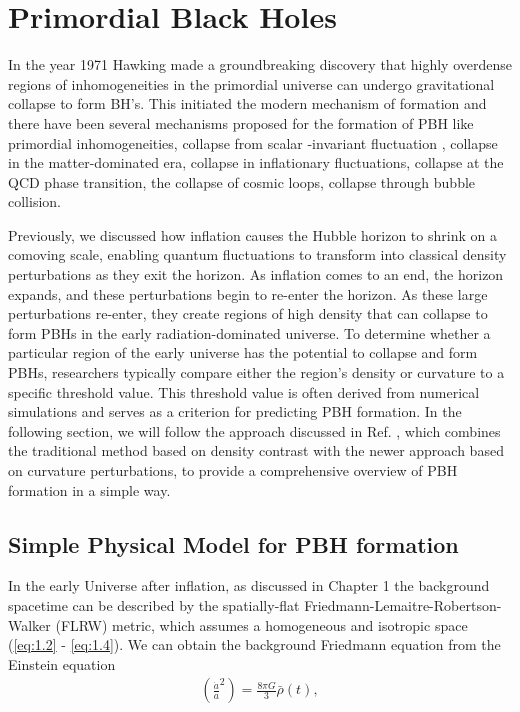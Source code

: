 \chapter{Primordial Black Holes}
\hspace{0.5cm}In the year 1971 Hawking \cite{1971MNRAS.152...75H} made a groundbreaking discovery that highly overdense regions of inhomogeneities in the primordial universe can undergo gravitational collapse to form BH's. This initiated the modern mechanism of formation and there have been several mechanisms proposed for the formation of PBH like primordial inhomogeneities\cite{1975ApJ...201....1C}, collapse from scalar -invariant fluctuation \cite{1975ApJ...201....1C}, collapse in the matter-dominated era, collapse in inflationary fluctuations, collapse at the QCD phase transition, the collapse of cosmic loops, collapse through bubble collision.

\hspace{0.5cm} Previously, we discussed how inflation causes the Hubble horizon to shrink on a comoving scale, enabling quantum fluctuations to transform into classical density perturbations as they exit the horizon. As inflation comes to an end, the horizon expands, and these perturbations begin to re-enter the horizon. As these large perturbations re-enter, they create regions of high density that can collapse to form PBHs in the early radiation-dominated universe. To determine whether a particular region of the early universe has the potential to collapse and form PBHs, researchers typically compare either the region's density or curvature to a specific threshold value. This threshold value is often derived from numerical simulations and serves as a criterion for predicting PBH formation. In the following section, we will follow the approach discussed in Ref. \cite{Sasaki_2018}, which combines the traditional method based on density contrast with the newer approach based on curvature perturbations, to provide a comprehensive overview of PBH formation in a simple way.

\section{Simple Physical Model for PBH formation}

In the early Universe after inflation, as discussed in Chapter 1 the background spacetime can be described by the spatially-flat Friedmann-Lemaitre-Robertson-Walker (FLRW) metric, which assumes a homogeneous and isotropic space (\ref{eq:1.2} - \ref{eq:1.4}). We can obtain the background Friedmann equation from the Einstein equation 
\begin{align}
    \left(\frac{\dot{a}}{a}^2\right) = \frac{8\pi G}{3} \bar{\rho}(t), \label{3.1}
\end{align}
 


